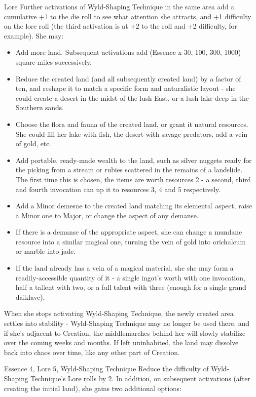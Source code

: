 \begin{Ability}{Lore}
  Further activations of Wyld-Shaping Technique in the same area add a cumulative +1 to the die roll to see what attention she attracts, and +1 difficulty on the lore roll (the third activation is at +2 to the roll and +2 difficulty, for example). She may:

  \begin{itemize}
    \item Add more land. Subsequent activations add (Essence x 30, 100, 300, 1000) square miles successively.
    \item Reduce the created land (and all subsequently created land) by a factor of ten, and reshape it to match a specific form and naturalistic layout - she could create a desert in the midst of the lush East, or a lush lake deep in the Southern sands.
    \item Choose the flora and fauna of the created land, or grant it natural resources. She could fill her lake with fish, the desert with savage predators, add a vein of gold, etc.
    \item Add portable, ready-made wealth to the land, such as silver nuggets ready for the picking from a stream or rubies scattered in the remains of a landslide. The first time this is chosen, the items are worth resources 2 - a second, third and fourth invocation can up it to resources 3, 4 and 5 respectively.
    \item Add a Minor demesne to the created land matching its elemental aspect, raise a Minor one to Major, or change the aspect of any demanse.
    \item If there is a demanse of the appropriate aspect, she can change a mundane resource into a similar magical one, turning the vein of gold into orichalcum or marble into jade.
    \item If the land already has a vein of a magical material, she she may form a readily-accessible quantity of it - a single ingot's worth with one invocation, half a tallent with two, or a full talent with three (enough for a single grand daiklave).
  \end{itemize}

  When she stops activating Wyld-Shaping Technique, the newly created area settles into stability - Wyld-Shaping Technique may no longer be used there, and if she's adjacent to Creation, the middlemarches behind her will slowly stabilize over the coming weeks and months. If left uninhabited, the land may dissolve back into chaos over time, like any other part of Creation.

  {Essence 4, Lore 5, Wyld-Shaping Technique}
  Reduce the difficulty of Wyld-Shaping Technique's Lore rolls by 2. In addition, on subsequent activations (after creating the initial land), she gains two additional options:


\end{Ability}
